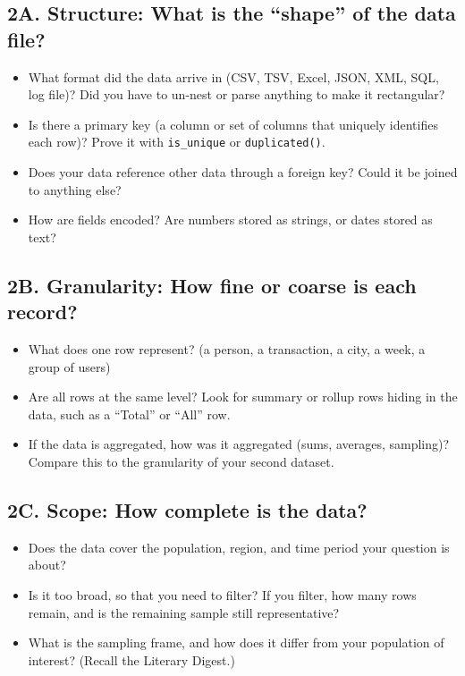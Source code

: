 \documentclass[11pt,letterpaper]{article}
\newcommand{\code}[1]{\texttt{#1}}
\begin{document}
\subsection{2A. Structure: What is the ``shape'' of the data file?}
\begin{itemize}
  \item What format did the data arrive in (CSV, TSV, Excel, JSON, XML, SQL, log file)? Did you have to un-nest or parse anything to make it rectangular?
  \item Is there a primary key (a column or set of columns that uniquely identifies each row)? Prove it with \code{is\_unique} or \code{duplicated()}.
  \item Does your data reference other data through a foreign key? Could it be joined to anything else?
  \item How are fields encoded? Are numbers stored as strings, or dates stored as text?
\end{itemize}

\subsection{2B. Granularity: How fine or coarse is each record?}
\begin{itemize}
  \item What does one row represent? (a person, a transaction, a city, a week, a group of users)
  \item Are all rows at the same level? Look for summary or rollup rows hiding in the data, such as a ``Total'' or ``All'' row.
  \item If the data is aggregated, how was it aggregated (sums, averages, sampling)? Compare this to the granularity of your second dataset.
\end{itemize}

\subsection{2C. Scope: How complete is the data?}
\begin{itemize}
  \item Does the data cover the population, region, and time period your question is about?
  \item Is it too broad, so that you need to filter? If you filter, how many rows remain, and is the remaining sample still representative?
  \item What is the sampling frame, and how does it differ from your population of interest? (Recall the Literary Digest.)
\end{itemize}
\end{document}
